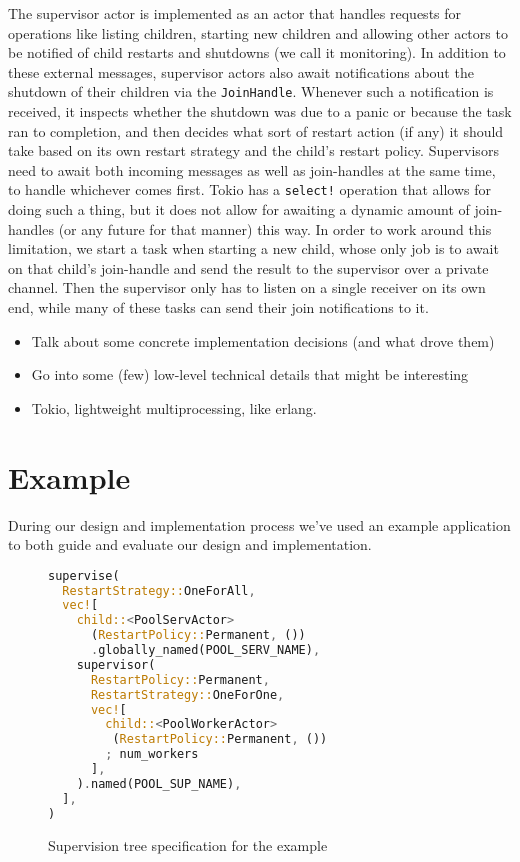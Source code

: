 \documentclass[a4paper]{article}
\begin{document}
\begin{itemize}
The supervisor actor is implemented as an actor that handles
requests for operations like listing children, starting new children and
allowing other actors to be notified of child restarts and shutdowns (we call it
monitoring). In addition to these external messages, supervisor actors also
await notifications about the shutdown of their children via the
\texttt{JoinHandle}. Whenever such a notification is received, it inspects
whether the shutdown was due to a panic or because the task ran to completion,
and then decides what sort of restart action (if any) it should take based on
its own restart strategy and the child's restart policy. Supervisors need to
await both incoming messages as well as join-handles at the same time, to handle
whichever comes first. Tokio has a \texttt{select!} operation that allows for
doing such a thing, but it does not allow for awaiting a dynamic amount of
join-handles (or any future for that manner) this way. In order to work
around this limitation, we start a task when starting a new child, whose only
job is to await on that child's join-handle and send the result to the
supervisor over a private channel. Then the supervisor only has to listen on a
single receiver on its own end, while many of these tasks can send their join
notifications to it.



\end{itemize}


\begin{itemize}
\item Talk about some concrete implementation decisions (and what drove them)
\item Go into some (few) low-level technical details that might be interesting
\item Tokio, lightweight multiprocessing, like erlang.
\end{itemize}

\section{Example}
During our design and implementation process we've used an example application
to both guide and evaluate our design and implementation.


\begin{wrapfigure}{r}{0.4\textwidth}
\begin{lstlisting}[language=Rust,basicstyle=\footnotesize]
supervise(
  RestartStrategy::OneForAll,
  vec![
    child::<PoolServActor>
      (RestartPolicy::Permanent, ())
      .globally_named(POOL_SERV_NAME),
    supervisor(
      RestartPolicy::Permanent,
      RestartStrategy::OneForOne,
      vec![
        child::<PoolWorkerActor>
         (RestartPolicy::Permanent, ())
        ; num_workers
      ],
    ).named(POOL_SUP_NAME),
  ],
)
\end{lstlisting}
  \caption{Supervision tree specification for the example}
  \label{fig:ex-spec}
\end{wrapfigure}
\end{document}
